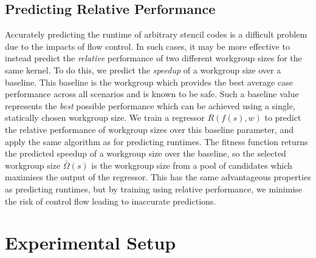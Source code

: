 \documentclass[preprint,nonatbib,10pt]{sigplanconf}
\begin{document}
\subsection{Predicting Relative Performance}

Accurately predicting the runtime of arbitrary stencil codes is a
difficult problem due to the impacts of flow control. In such cases,
it may be more effective to instead predict the \emph{relative}
performance of two different workgroup sizes for the same kernel. To
do this, we predict the \emph{speedup} of a workgroup size over a
baseline. This baseline is the workgroup which provides the best
average case performance across all scenarios and is known to be
safe. Such a baseline value represents the \emph{best} possible
performance which can be achieved using a single, statically chosen
workgroup size. We train a regressor $R(f(s), w)$ to predict the
relative performance of workgroup sizes over this baseline parameter,
and apply the same algorithm as for predicting runtimes. The fitness
function returns the predicted speedup of a workgroup size over the
baseline, so the selected workgroup size $\bar{\Omega}(s)$ is the
workgroup size from a pool of candidates which maximises the output of
the regressor. This has the same advantageous properties as predicting
runtimes, but by training using relative performance, we minimise the
risk of control flow leading to inaccurate predictions.


\section{Experimental Setup}
\end{document}
